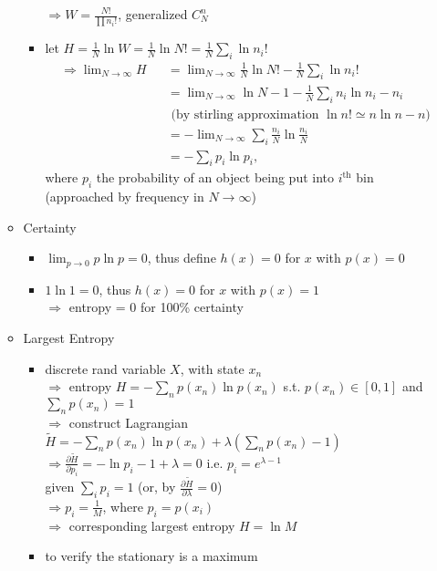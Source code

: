\begin{itemize}
\begin{itemize}
\begin{itemize}
		$\Rightarrow W=\frac{N!}{\prod n_i!}$, generalized $C_N^n$
		\item let $H=\frac1N\ln W = \frac1N\ln N!=\frac1N\sum_i\ln n_i!$ \\
		$\displaystyle \begin{alignedat}{2}
		&\Rightarrow \lim_{N\rightarrow\infty}H &&= \lim_{N\rightarrow\infty}\frac{1}{N}\ln N! - \frac{1}{N}\sum_i\ln n_i! \\
		& &&=\lim_{N\rightarrow\infty} \ln N -1 - \frac{1}{N}\sum_i n_i\ln n_i - n_i \\
		& && \text{ (by stirling approximation } \ln n!\simeq n\ln n - n) \\
		& &&= -\lim_{N\rightarrow \infty} \sum_i \frac{n_i}{N}\ln \frac{n_i}{N} \\
		& &&= -\sum_i p_i\ln p_i, 
		\end{alignedat}$ \\
		where $p_i$ the probability of an object being put into $i^\text{th}$ bin (approached by frequency in $N\rightarrow\infty$)
		\end{itemize}
		\item Certainty
		\begin{itemize}
		\item $\lim_{p\rightarrow0}p\ln p = 0$, thus define $h(x)=0$ for $x$ with $p(x)=0$
		\item $1\ln 1 = 0$, thus $h(x)=0$ for $x$ with $p(x)=1$ \\
		$\Rightarrow$ entropy = 0 for 100\% certainty
		\end{itemize}
	\item Largest Entropy
		\begin{itemize}
		\item discrete rand variable $X$, with state $x_n$ \\
		$\Rightarrow$ entropy $H = -\sum_n p(x_n)\ln p(x_n)$ s.t. $p(x_n)\in[0,1]$ and $\sum_n p(x_n)=1$ \\
		$\Rightarrow$ construct Lagrangian $\tilde H = -\sum_n p(x_n)\ln p(x_n) + \lambda \left( \sum_n p(x_n) - 1 \right)$ \\
		$\Rightarrow \frac{\partial \tilde{H}}{\partial p_i} = -\ln p_i - 1 + \lambda = 0$ i.e. $p_i=e^{\lambda-1}$ \\
		given $\sum_i p_i = 1$ (or, by $\frac{\partial \tilde{H}}{\partial \lambda}=0$) \\
		$\Rightarrow p_i = \frac1M$, where $p_i=p(x_i)$ \\
		$\Rightarrow$ corresponding largest entropy $H=\ln M$
		\item to verify the stationary is a maximum \\

\end{itemize}
\end{itemize}
\end{itemize}
